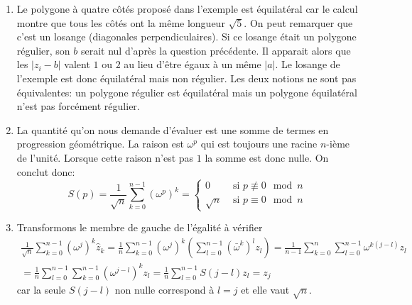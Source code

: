 \begin{enumerate}
\begin{enumerate}
\end{enumerate}
 
\item  Le polygone à quatre côtés proposé dans l'exemple est équilatéral car le calcul montre que tous les côtés ont la même longueur $\sqrt{5}$. On peut remarquer que c'est un losange (diagonales perpendiculaires).\newline
Si ce losange était un polygone régulier, son $b$ serait nul d'après la question précédente. Il apparait alors que les $|z_i -b|$ valent $1$ ou $2$ au lieu d'être égaux à un même $|a|$. Le losange de l'exemple est donc équilatéral mais non régulier. Les deux notions ne sont pas équivalentes: un polygone régulier est équilatéral mais un polygone équilatéral n'est pas forcément régulier. 

 \item La quantité qu'on nous demande d'évaluer est une somme de termes en progression géométrique. La raison est $\omega^p$ qui est toujours une racine $n$-ième de l'unité. Lorsque cette raison n'est pas $1$ la somme est donc nulle. On conclut donc:
\begin{displaymath}
 S(p)=\frac{1}{\sqrt{n}}\sum_{k=0}^{n-1}\left( \omega^p\right)^k=
\left\lbrace  
\begin{aligned}
 0 &\text{ si } p\not \equiv 0 \mod n \\
 \sqrt{n} &\text{ si } p \equiv 0 \mod n
\end{aligned}
\right. 
\end{displaymath}

 \item Transformons le membre de gauche de l'égalité à vérifier
\begin{multline*}
  \frac{1}{\sqrt{n}}\sum_{k=0}^{n-1}\left( \omega^j\right)^k \widehat{z}_k 
=   \frac{1}{n}\sum_{k=0}^{n-1}\left( \omega^j\right)^k
\left(
\sum_{l=0}^{n-1}\left( \bar{\omega}^k\right)^lz_l
\right)
= \frac{1}{n-1}\sum_{k=0}^{n} \sum_{l=0}^{n-1} \omega^{k(j-l)}z_l\\
= \frac{1}{n}\sum_{l=0}^{n-1} \sum_{k=0}^{n-1} \left( \omega^{j-l}\right)^kz_l
= \frac{1}{n}\sum_{l=0}^{n-1} S(j-l)z_l
=z_j
\end{multline*}
car la seule $S(j-l)$ non nulle correspond à $l=j$ et elle vaut $\sqrt{n}$.
\end{enumerate}


